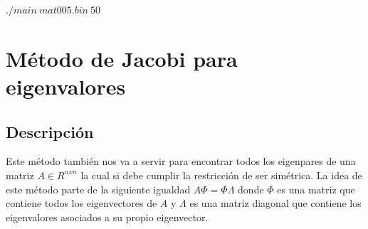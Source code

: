 \documentclass[12pt]{article}
\begin{document}
$./main\ mat005.bin\ 50$

\section{Método de Jacobi para eigenvalores}

\subsection{Descripción}
Este método también nos va a servir para encontrar todos los eigenpares de una matriz $A \in R^{nxn}$ la cual si debe cumplir la restricción de ser simétrica. La idea de este método parte de la siguiente igualdad $A\Phi = \Phi\Lambda$ donde $\Phi$ es una matriz que contiene todos los eigenvectores de $A$ y $\Lambda$ es una matriz diagonal que contiene los eigenvalores asociados a su propio eigenvector.
\end{document}
